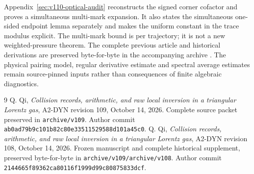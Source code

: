 \documentclass[11pt,reqno]{amsart}
\numberwithin{equation}{section}
\theoremstyle{definition}\newtheorem{definition}[theorem]{Definition}
\theoremstyle{remark}\newtheorem{remark}[theorem]{Remark}
\begin{document}
Appendix~\ref{sec:v110-optical-audit} reconstructs the signed corner
cofactor and proves a simultaneous multi-mark expansion. It also
states the simultaneous one-sided endpoint lemma separately and
makes the uniform constant in the trace modulus explicit. The
multi-mark bound is per trajectory; it is not a new weighted-pressure
theorem. The complete previous article and historical derivations
are preserved byte-for-byte in the accompanying archive \cite{Q109}.
The physical pairing model, regular derivative estimate and spectral
average estimates remain source-pinned inputs rather than consequences
of finite algebraic diagnostics.







\appendix


\begin{thebibliography}{9}
 Q. Qi,
\emph{Collision records, arithmetic, and raw local inversion in a
triangular Lorentz gas}, A2-DYN revision 109, October 14, 2026.
Complete source packet preserved in \texttt{archive/v109}.
Author commit \texttt{ab0ad79b9c101b82c80e33511529588d101a45c0}.
 Q. Qi,
\emph{Collision records, arithmetic, and raw local inversion in a
triangular Lorentz gas}, A2-DYN revision 108, October 14, 2026.
Frozen manuscript and complete historical supplement, preserved
byte-for-byte in \texttt{archive/v109/archive/v108}. Author commit
\texttt{2144665f89362ca80116f1999d99c80875833dcf}.
\end{thebibliography}
\end{document}
